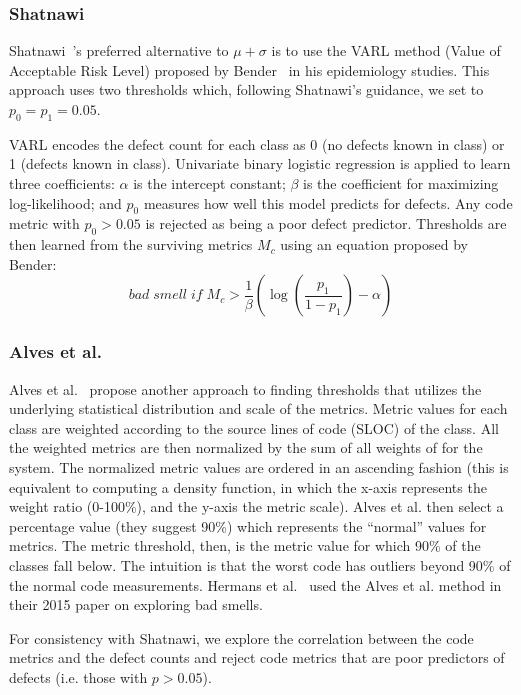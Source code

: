 \documentclass{sig-alternate}
\theoremstyle{break}
\begin{document}
\subsubsection{ Shatnawi}
Shatnawi~\cite{Shatnawi10}'s preferred alternative to $\mu+\sigma$
is to use the VARL method (Value of Acceptable Risk Level) proposed by Bender~\cite{bender99} in his epidemiology studies.  This approach uses two
thresholds which, following Shatnawi's guidance, we set to
$p_0=p_1=0.05$. 

VARL encodes the defect count
for each class as 0 (no defects known in class) or 1 (defects known in class).
Univariate binary logistic regression is applied to learn three coefficients:  
 $\alpha$ is the intercept constant;
    $\beta$ is the coefficient for maximizing log-likelihood;
  and $p_0$  
    measures   how well this   model predicts for   defects.
Any code metric with $p_0>0.05$ is  rejected as being a poor defect predictor. Thresholds are then learned from the surviving metrics $M_c$ using
an equation proposed by Bender:
\begin{equation}
 \mathit{bad\; smell\; if\;} M_c > \frac{1}{\beta }\left( {\log \left( {\frac{{{p_1}}}{{1 - {p_1}}}} \right) - \alpha } \right) 
\end{equation}

\newpage
\subsubsection{ Alves et al.}
Alves et al.~\cite{Alves2010} propose another approach
to finding thresholds that  utilizes the underlying statistical distribution and scale of the metrics. 
Metric values for each class are weighted according to the source lines of code (SLOC) of the class. All the weighted metrics are then normalized by the sum of all weights of for the system. 
The normalized metric values are ordered in an ascending fashion (this is equivalent to computing a density function, in which the x-axis represents the weight ratio (0-100\%), and the y-axis the metric scale).
Alves et al. then select a percentage value (they suggest 90\%) which represents the ``normal'' values for metrics. The metric threshold, then, is the metric value for which 90\% of the classes fall below. The intuition  is that the worst code has outliers beyond 90\% of the normal code measurements. Hermans et al.~\cite{hermans15} used the
Alves et al. method in their  2015 paper on
exploring bad smells.

For consistency
with Shatnawi, we explore the correlation between
the code metrics and the defect counts and   reject code metrics that are poor predictors of defects (i.e.   those  with $p > 0.05$).
\end{document}
